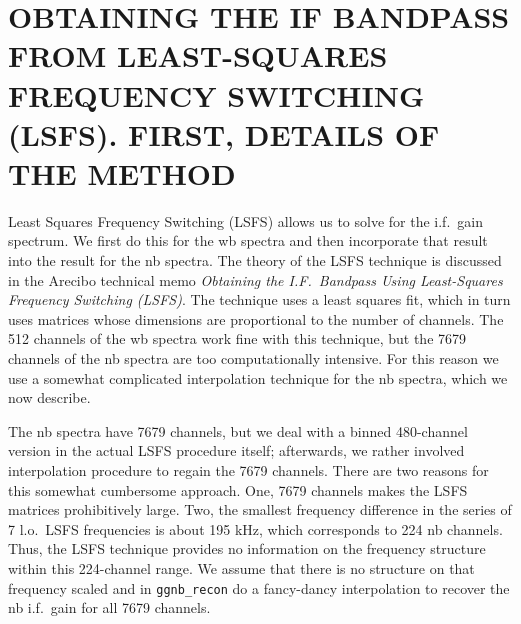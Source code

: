\documentclass[psfig,preprint]{aastex}
\begin{document}
\section{ OBTAINING THE IF BANDPASS FROM LEAST-SQUARES FREQUENCY
SWITCHING (LSFS). FIRST, DETAILS OF THE METHOD}
\label{lsfsmethod}

	Least Squares Frequency Switching (LSFS) allows us to solve for
the i.f.\ gain spectrum. We first do this for the wb spectra and then
incorporate that result into the result for the nb spectra. The theory of
the LSFS technique is discussed in the Arecibo technical memo {\it
Obtaining the I.F.\ Bandpass Using Least-Squares Frequency Switching
(LSFS)}. The technique uses a least squares fit, which in turn uses
matrices whose dimensions are proportional to the number of
channels. The 512 channels of the wb spectra work fine with this
technique, but the 7679 channels of the nb spectra are too
computationally intensive. For this reason we use a somewhat complicated
interpolation technique for the nb spectra, which we now describe.

	The nb spectra have 7679 channels, but we deal with a binned
480-channel version in the actual LSFS procedure itself; afterwards, we
rather involved interpolation procedure to regain the 7679 channels. 
There are two reasons for this somewhat cumbersome approach. One, 7679
channels makes the LSFS matrices prohibitively large. Two, the smallest
frequency difference in the series of 7 l.o.\ LSFS frequencies is about
195 kHz, which corresponds to 224 nb channels.  Thus, the LSFS technique
provides no information on the frequency structure within this
224-channel range.  We assume that there is no structure on that
frequency scaled and in \verb$ggnb_recon$ do a fancy-dancy interpolation
to recover the nb i.f.\ gain for all 7679 channels. 
\end{document}
